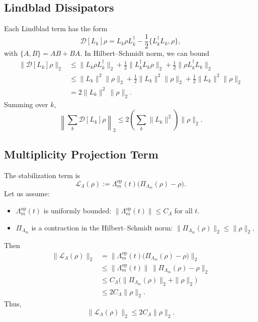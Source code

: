 \documentclass[11pt]{article}
\begin{document}
\subsection{Lindblad Dissipators}

Each Lindblad term has the form
\[
\mathcal{D}[L_k]\rho
= L_k\rho L_k^\dagger - \frac{1}{2}\{L_k^\dagger L_k, \rho\},
\]
with \(\{A,B\} = AB + BA\). In Hilbert--Schmidt norm, we can bound
\begin{align*}
  \|\mathcal{D}[L_k]\rho\|_2
  &\le \|L_k \rho L_k^\dagger\|_2
       + \frac{1}{2}\|L_k^\dagger L_k \rho\|_2
       + \frac{1}{2}\|\rho L_k^\dagger L_k\|_2 \\
  &\le \|L_k\|^2 \|\rho\|_2
       + \frac{1}{2}\|L_k\|^2 \|\rho\|_2
       + \frac{1}{2}\|L_k\|^2 \|\rho\|_2 \\
  &= 2\|L_k\|^2\,\|\rho\|_2.
\end{align*}
Summing over \(k\),
\begin{equation}
  \left\|\sum_k \mathcal{D}[L_k]\rho\right\|_2
  \le 2\left(\sum_k \|L_k\|^2\right) \|\rho\|_2. \label{eq:Lindblad-bound}
\end{equation}

\subsection{Multiplicity Projection Term}

The stabilization term is
\[
\mathcal{L}_{\Lambda}(\rho)
:= \Lambda_m^{\mathrm{op}}(t)\bigl(\Pi_{\Lambda_m}(\rho) - \rho\bigr).
\]
Let us assume:
\begin{itemize}[nosep]
  \item \(\Lambda_m^{\mathrm{op}}(t)\) is uniformly bounded: \(\|\Lambda_m^{\mathrm{op}}(t)\| \le C_{\Lambda}\) for all \(t\).
  \item \(\Pi_{\Lambda_m}\) is a contraction in the Hilbert--Schmidt norm:
        \(\|\Pi_{\Lambda_m}(\rho)\|_2 \le \|\rho\|_2\).
\end{itemize}
Then
\begin{align*}
  \|\mathcal{L}_{\Lambda}(\rho)\|_2
  &= \|\Lambda_m^{\mathrm{op}}(t)\bigl(\Pi_{\Lambda_m}(\rho) - \rho\bigr)\|_2 \\
  &\le \|\Lambda_m^{\mathrm{op}}(t)\|\,
       \|\Pi_{\Lambda_m}(\rho) - \rho\|_2 \\
  &\le C_{\Lambda} \bigl( \|\Pi_{\Lambda_m}(\rho)\|_2 + \|\rho\|_2 \bigr) \\
  &\le 2 C_{\Lambda} \|\rho\|_2.
\end{align*}
Thus,
\begin{equation}
  \|\mathcal{L}_{\Lambda}(\rho)\|_2
  \le 2 C_{\Lambda} \|\rho\|_2. \label{eq:Lambda-bound}
\end{equation}
\end{document}
